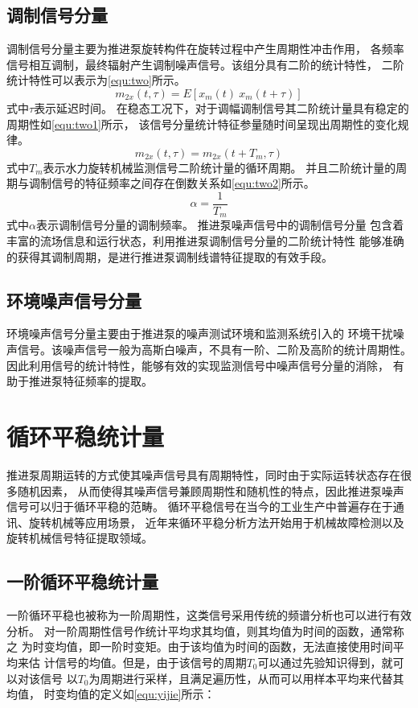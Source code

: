 \subsection{调制信号分量}
调制信号分量主要为推进泵旋转构件在旋转过程中产生周期性冲击作用，
各频率信号相互调制，最终辐射产生调制噪声信号。该组分具有二阶的统计特性，
二阶统计特性可以表示为\autoref{equ:two}所示。
\begin{equation}
    \label{equ:two}
    m_{2x}\left ( t, \tau \right )  =E\left [ x_{m}\left ( t \right ) \ x_{m}\left ( t+\tau \right )  \right ] 
\end{equation}
式中$\tau$表示延迟时间。
在稳态工况下，对于调幅调制信号其二阶统计量具有稳定的周期性如\autoref{equ:two1}所示，
该信号分量统计特征参量随时间呈现出周期性的变化规律。
\begin{equation}
    \label{equ:two1}
    m_{2x}\left ( t, \tau \right )  =m_{2x}\left ( t+T_m, \tau \right )
\end{equation}
式中$T_m$表示水力旋转机械监测信号二阶统计量的循环周期。
并且二阶统计量的周期与调制信号的特征频率之间存在倒数关系如\autoref{equ:two2}所示。
\begin{equation}
    \label{equ:two2}
    \alpha =\frac{1}{T_{m} } 
\end{equation}
式中$\alpha$表示调制信号分量的调制频率。
推进泵噪声信号中的调制信号分量
包含着丰富的流场信息和运行状态，利用推进泵调制信号分量的二阶统计特性
能够准确的获得其调制周期，是进行推进泵调制线谱特征提取的有效手段。
\subsection{环境噪声信号分量}
环境噪声信号分量主要由于推进泵的噪声测试环境和监测系统引入的
环境干扰噪声信号。该噪声信号一般为高斯白噪声，不具有一阶、二阶及高阶的统计周期性。
因此利用信号的统计特性，能够有效的实现监测信号中噪声信号分量的消除，
有助于推进泵特征频率的提取。

\section{循环平稳统计量}
推进泵周期运转的方式使其噪声信号具有周期特性，同时由于实际运转状态存在很多随机因素，
从而使得其噪声信号兼顾周期性和随机性的特点，因此推进泵噪声信号可以归于循环平稳的范畴。
循环平稳信号在当今的工业生产中普遍存在于通讯、旋转机械等应用场景，
近年来循环平稳分析方法开始用于机械故障检测以及旋转机械信号特征提取领域。
\subsection{一阶循环平稳统计量}
一阶循环平稳也被称为一阶周期性，这类信号采用传统的频谱分析也可以进行有效分析。
对一阶周期性信号作统计平均求其均值，则其均值为时间的函数，通常称之
为时变均值，即一阶时变矩。由于该均值为时间的函数，无法直接使用时间平均来估
计信号的均值\cite{zhou2006}。但是，由于该信号的周期$T_{0}$可以通过先验知识得到，就可以对该信号
以$T_{0}$为周期进行采样，且满足遍历性，从而可以用样本平均来代替其均值，
时变均值的定义如\autoref{equ:yijie}所示：

